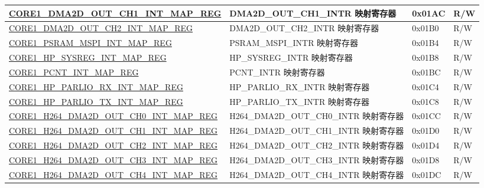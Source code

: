 \begin{longtable}{ | p{8.7cm} | p{6.2cm} | p{1.3cm} | p{1cm} | }
\hyperref[regdesc:CORE1DMA2DOUTCH1INTMAPREG]{CORE1\_DMA2D\_OUT\_CH1\_INT\_MAP\_REG} & DMA2D\_OUT\_CH1\_INTR 映射寄存器 & 0x01AC & R/W \\ \hline

\hyperref[regdesc:CORE1DMA2DOUTCH2INTMAPREG]{CORE1\_DMA2D\_OUT\_CH2\_INT\_MAP\_REG} & DMA2D\_OUT\_CH2\_INTR 映射寄存器 & 0x01B0 & R/W \\ \hline

\hyperref[regdesc:CORE1PSRAMMSPIINTMAPREG]{CORE1\_PSRAM\_MSPI\_INT\_MAP\_REG} & PSRAM\_MSPI\_INTR 映射寄存器 & 0x01B4 & R/W \\ \hline

\hyperref[regdesc:CORE1HPSYSREGINTMAPREG]{CORE1\_HP\_SYSREG\_INT\_MAP\_REG} & HP\_SYSREG\_INTR 映射寄存器 & 0x01B8 & R/W \\ \hline

\hyperref[regdesc:CORE1PCNTINTMAPREG]{CORE1\_PCNT\_INT\_MAP\_REG} & PCNT\_INTR 映射寄存器 & 0x01BC & R/W \\ \hline

\hyperref[regdesc:CORE1HPPARLIORXINTMAPREG]{CORE1\_HP\_PARLIO\_RX\_INT\_MAP\_REG} & HP\_PARLIO\_RX\_INTR 映射寄存器 & 0x01C4 & R/W \\ \hline

\hyperref[regdesc:CORE1HPPARLIOTXINTMAPREG]{CORE1\_HP\_PARLIO\_TX\_INT\_MAP\_REG} & HP\_PARLIO\_TX\_INTR 映射寄存器 & 0x01C8 & R/W \\ \hline

\hyperref[regdesc:CORE1H264DMA2DOUTCH0INTMAPREG]{CORE1\_H264\_DMA2D\_OUT\_CH0\_INT\_MAP\_REG} & H264\_DMA2D\_OUT\_CH0\_INTR 映射寄存器 & 0x01CC & R/W \\ \hline

\hyperref[regdesc:CORE1H264DMA2DOUTCH1INTMAPREG]{CORE1\_H264\_DMA2D\_OUT\_CH1\_INT\_MAP\_REG} & H264\_DMA2D\_OUT\_CH1\_INTR 映射寄存器 & 0x01D0 & R/W \\ \hline

\hyperref[regdesc:CORE1H264DMA2DOUTCH2INTMAPREG]{CORE1\_H264\_DMA2D\_OUT\_CH2\_INT\_MAP\_REG} & H264\_DMA2D\_OUT\_CH2\_INTR 映射寄存器 & 0x01D4 & R/W \\ \hline

\hyperref[regdesc:CORE1H264DMA2DOUTCH3INTMAPREG]{CORE1\_H264\_DMA2D\_OUT\_CH3\_INT\_MAP\_REG} & H264\_DMA2D\_OUT\_CH3\_INTR 映射寄存器 & 0x01D8 & R/W \\ \hline

\hyperref[regdesc:CORE1H264DMA2DOUTCH4INTMAPREG]{CORE1\_H264\_DMA2D\_OUT\_CH4\_INT\_MAP\_REG} & H264\_DMA2D\_OUT\_CH4\_INTR 映射寄存器 & 0x01DC & R/W \\ \hline


\end{longtable}
